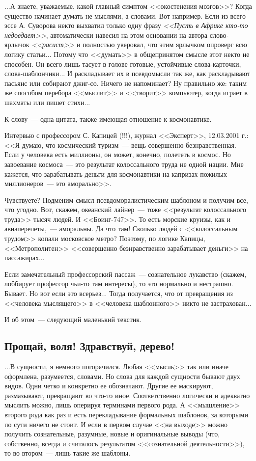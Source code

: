 \documentclass{scrbook}
\newcommand{\flqq}{<<}
\newcommand{\frqq}{>>}
\newcommand{\mdash}{~--- }
\newcommand{\commamdash}{~--- } %
\newcommand{\essaysection}[1]{\subsection*{#1}\nopagebreak}
\begin{document}
\singlespacing

...А знаете, уважаемые, какой главный симптом {\flqq}окостенения мозгов{\frqq}? Когда существо начинает думать не мыслями, а словами. Вот например. Если из всего эссе А. Суворова некто выхватил только одну фразу \emph{{\flqq}Пусть в Африке кто-то недоедает{\frqq}}, автоматически навесил на этом основании на автора слово-ярлычок \emph{{\flqq}расист{\frqq}} и полностью уверовал, что этим ярлычком опроверг всю логику статьи... Потому что {\flqq}думать{\frqq} в общепринятом смысле этот некто не способен. Он всего лишь тасует в голове готовые, устойчивые слова-карточки, слова-шаблончики... И раскладывает их в псевдомысли так же, как раскладывают пасьянс или собирают джиг-со. Ничего не напоминает? Ну правильно же: таким же способом перебора {\flqq}мыслит{\frqq} и {\flqq}творит{\frqq} компьютер, когда играет в шахматы или пишет стихи...

К слову{\mdash}одна цитата, также имеющая отношение к космонавтике.

Интервью с профессором С. Капицей (!!!), журнал {\flqq}Эксперт{\frqq}, 12.03.2001 г.: {\flqq}Я думаю, что космический туризм{\mdash}вещь совершенно безнравственная. Если у человека есть миллионы, он может, конечно, полететь в космос. Но завоевание космоса{\mdash}это результат колоссального труда не одной нации. Мне кажется, что зарабатывать деньги для космонавтики на капризах пожилых миллионеров{\mdash}это аморально{\frqq}.

Чувствуете? Подменим смысл псевдоморалистическим шаблоном и получим все, что угодно. Вот, скажем, океанский лайнер{\mdash}тоже {\flqq}результат колоссального труда{\frqq} тысяч людей. И {\flqq}Боинг-747{\frqq}. То есть морские круизы, как и авиаперелеты,{\commamdash}аморальны. Да что там! Сколько людей с {\flqq}колоссальным трудом{\frqq} копали московское метро? Поэтому, по логике Капицы, {\flqq}Метрополитен{\frqq} {\flqq}совершенно безнравственно зарабатывает деньги{\frqq} на пассажирах...

Если замечательный профессорский пассаж{\mdash}сознательное лукавство (скажем, лоббирует профессор чьи-то там интересы), то это нормально и нестрашно. Бывает. Но вот если это всерьез... Тогда получается, что от превращения из {\flqq}человека мыслящего{\frqq} в {\flqq}человека шаблонного{\frqq} никто не застрахован...

И об этом{\mdash}следующий маленький текстик.

\essaysection{Прощай, воля! Здравствуй, дерево!}

...В сущности, я немного погорячился. Любая {\flqq}мысль{\frqq} так или иначе оформлена, разумеется, словами. Но слова для каждой сущности бывают двух видов. Одни четко и конкретно ее обозначают. Другие ее маскируют, размазывают, превращают во что-то иное. Соответственно логически и адекватно мыслить можно, лишь оперируя терминами первого рода. А {\flqq}мышление{\frqq} второго рода как раз и есть перекладывание формальных шаблонов, за которыми по сути ничего не стоит. И если в первом случае {\flqq}на выходе{\frqq} можно получить сознательные, разумные, новые и оригинальные выводы (что, собственно, всегда и считалось результатом {\flqq}сознательной деятельности{\frqq}), то во втором{\mdash}лишь такие же шаблоны.
\end{document}
